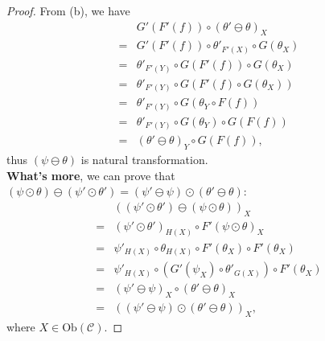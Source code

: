 \documentclass{article}
\begin{document}
\begin{proof}
		From (b), we have
		\begin{align}\label{(b)}
			 & G'(F'(f))\circ(\theta'\ominus\theta)_X\tag{Assumption}\\
			=& G'(F'(f))\circ\theta'_{F'(X)}\circ G(\theta_X)\tag{Definition of horizontal composition}\\
			=& \theta'_{F'(Y)}\circ G(F'(f))\circ G(\theta_X)\tag{Property of natural transformation $\theta'$}\\
			=& \theta'_{F'(Y)}\circ G(F'(f)\circ G(\theta_X))\tag{Property of functor $G$}\\
			=& \theta'_{F'(Y)}\circ G(\theta_Y\circ F(f))\tag{Property of natural transformation $\theta$}\\
			=& \theta'_{F'(Y)}\circ G(\theta_Y)\circ G(F(f))\tag{Property of functor $G$}\\
			=& (\theta'\ominus\theta)_Y\circ G(F(f))\tag{Definition of horizontal composition},
		\end{align}
		thus $(\psi\ominus\theta)$ is natural transformation.\\
		
		{\bf What's more}, we can prove that $(\psi\odot\theta)\ominus(\psi'\odot\theta')=(\psi'\ominus\psi)\odot(\theta'\ominus\theta)$:
		\begin{align}
			 & ((\psi'\odot\theta')\ominus(\psi\odot\theta))_X\tag{Assumption}\\
			=& (\psi'\odot\theta')_{H(X)}\circ F'(\psi\odot\theta)_X\tag{Definition of horizontal composition}\\
			=& \psi'_{H(X)}\circ\theta_{H(X)}\circ F'(\theta_X)\circ F'(\theta_X)\tag{Definition of longitudinal composition, Property of functor $F'$}\\
			=& \psi'_{H(X)}\circ(G'(\psi_X)\circ \theta'_{G(X)})\circ F'(\theta_X)\tag{b}\\
			=& (\psi'\ominus\psi)_X\circ(\theta'\ominus\theta)_X\tag{Definition of horizontal composition}\\
			=& ((\psi'\ominus\psi)\odot(\theta'\ominus\theta))_X,\tag{Definition of longitudinal composition}
		\end{align}
		where $X\in\mathrm{Ob}(\mathcal{C})$.
\end{proof}
\end{document}
